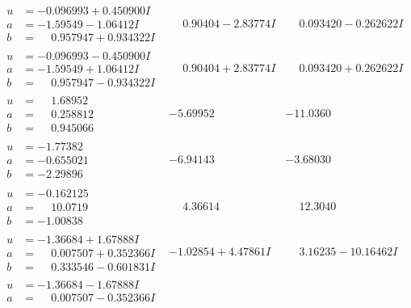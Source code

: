 \documentclass[1p]{elsarticle_modified}
\theoremstyle{definition}
\begin{document}
$$\begin{array}{c|c|c}
\begin{aligned}
u &= -0.096993 + 0.450900 I \\
a &= -1.59549 - 1.06412 I \\
b &= \phantom{-}0.957947 + 0.934322 I\end{aligned}
 & \phantom{-}0.90404 - 2.83774 I & \phantom{-}0.093420 - 0.262622 I \\ \hline\begin{aligned}
u &= -0.096993 - 0.450900 I \\
a &= -1.59549 + 1.06412 I \\
b &= \phantom{-}0.957947 - 0.934322 I\end{aligned}
 & \phantom{-}0.90404 + 2.83774 I & \phantom{-}0.093420 + 0.262622 I \\ \hline\begin{aligned}
u &= \phantom{-}1.68952\phantom{ +0.000000I} \\
a &= \phantom{-}0.258812\phantom{ +0.000000I} \\
b &= \phantom{-}0.945066\phantom{ +0.000000I}\end{aligned}
 & -5.69952\phantom{ +0.000000I} & -11.0360\phantom{ +0.000000I} \\ \hline\begin{aligned}
u &= -1.77382\phantom{ +0.000000I} \\
a &= -0.655021\phantom{ +0.000000I} \\
b &= -2.29896\phantom{ +0.000000I}\end{aligned}
 & -6.94143\phantom{ +0.000000I} & -3.68030\phantom{ +0.000000I} \\ \hline\begin{aligned}
u &= -0.162125\phantom{ +0.000000I} \\
a &= \phantom{-}10.0719\phantom{ +0.000000I} \\
b &= -1.00838\phantom{ +0.000000I}\end{aligned}
 & \phantom{-}4.36614\phantom{ +0.000000I} & \phantom{-}12.3040\phantom{ +0.000000I} \\ \hline\begin{aligned}
u &= -1.36684 + 1.67888 I \\
a &= \phantom{-}0.007507 + 0.352366 I \\
b &= \phantom{-}0.333546 - 0.601831 I\end{aligned}
 & -1.02854 + 4.47861 I & \phantom{-}3.16235 - 10.16462 I \\ \hline\begin{aligned}
u &= -1.36684 - 1.67888 I \\
a &= \phantom{-}0.007507 - 0.352366 I \\

\end{aligned}
\end{array}$$
\end{document}
